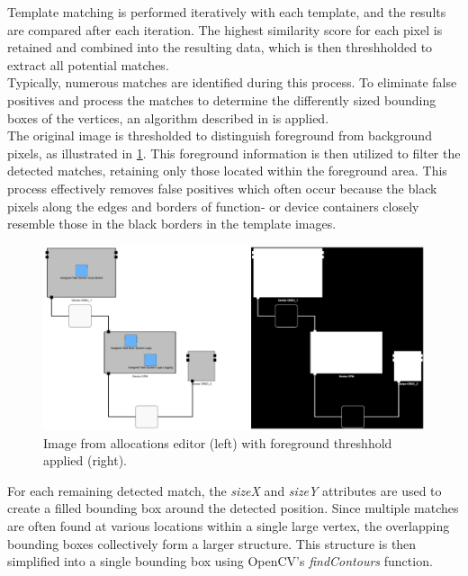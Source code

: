Template matching is performed iteratively with each template, and the results are compared after each iteration. The highest similarity score for each pixel is retained and combined into the resulting data, which is then threshholded to extract all potential matches.\\
Typically, numerous matches are identified during this process. To eliminate false positives and process the matches to determine the differently sized bounding boxes of the vertices, an algorithm described in \cite{og_paper} is applied.\\
The original image is thresholded to distinguish foreground from background pixels, as illustrated in \ref{fig_foreground_threshhold}. This foreground information is then utilized to filter the detected matches, retaining only those located within the foreground area. This process effectively removes false positives which often occur because the black pixels along the edges and borders of function- or device containers closely resemble those in the black borders in the template images.
\begin{figure}[h]
    \centering
    \includegraphics[width=0.55\linewidth]{Pictures/foreground_threshhold.png}
    \caption{Image from allocations editor (left) with foreground threshhold applied (right).}
    \label{fig_foreground_threshhold}
\end{figure}
For each remaining detected match, the \textit{sizeX} and \textit{sizeY} attributes are used to create a filled bounding box around the detected position. Since multiple matches are often found at various locations within a single large vertex, the overlapping bounding boxes collectively form a larger structure. This structure is then simplified into a single bounding box using OpenCV's \textit{findContours} function.

